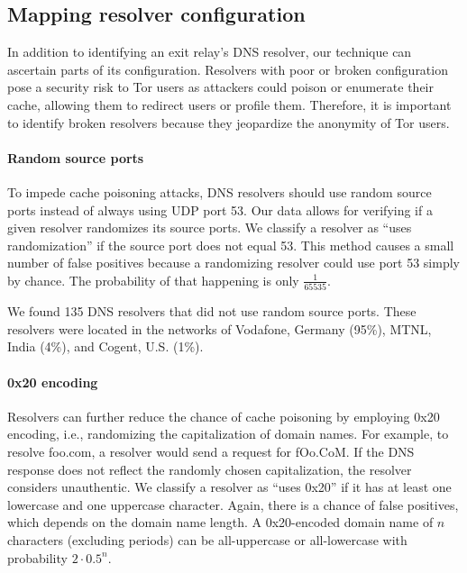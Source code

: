 \iffalse
\subsection{Mapping resolver configuration}
\label{sec:mapping-configuration}
In addition to identifying an exit relay's DNS resolver, our technique can
ascertain parts of its configuration.  Resolvers with poor or broken
configuration pose a security risk to Tor users as attackers could poison or
enumerate their cache, allowing them to redirect users or profile them.
Therefore, it is important to identify broken resolvers because they jeopardize
the anonymity of Tor users.

\paragraph{Random source ports}
To impede cache poisoning attacks, DNS resolvers should use random source ports
instead of always using UDP port 53.  Our data allows for verifying if a given
resolver randomizes its source ports.  We classify a resolver as ``uses
randomization'' if the source port does not equal 53.  This method
causes a small number of false positives because a randomizing resolver could
use port 53 simply by chance.  The probability of that happening is
only $\frac{1}{65535}$.

We found 135 DNS resolvers that did not use random source ports.  These
resolvers were located in the networks of Vodafone, Germany (95\%), MTNL, India
(4\%), and Cogent, U.S. (1\%).

\paragraph{0x20 encoding}
Resolvers can further reduce the chance of cache poisoning by employing 0x20
encoding, i.e., randomizing the capitalization of domain names.  For example,
to resolve foo.com, a resolver would send a request for fOo.CoM.  If the DNS
response does not reflect the randomly chosen capitalization, the resolver
considers unauthentic.  We classify a resolver as ``uses 0x20'' if it has at
least one lowercase and one uppercase character.  Again, there is a chance of
false positives, which depends on the domain name length.  A 0x20-encoded
domain name of $n$ characters (excluding periods) can be all-uppercase or
all-lowercase with probability $2 \cdot 0.5^n$.

